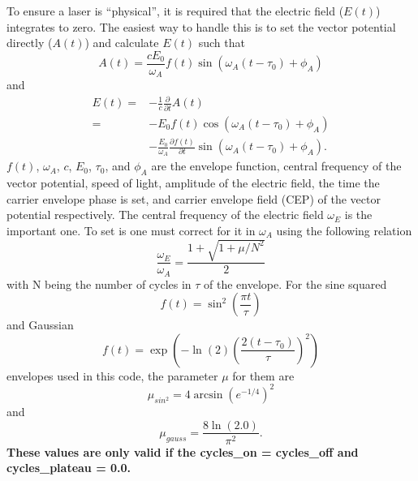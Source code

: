 \documentclass{article}
\begin{document}
To ensure a laser is ``physical'', it is required that the electric field ($E(t)$) integrates to zero. The easiest way to handle this is to set the vector potential directly ($A(t)$) and calculate $E(t)$ such that
\begin{equation}
A(t) = \frac{cE_0}{\omega_A} f(t) \sin(\omega_A(t-\tau_0)+\phi_A)
\label{eq:afield}
\end{equation}
and
\begin{equation}
\begin{split}
\label{eq:efield}
E(t) =& -\frac{1}{c}\frac{\partial}{\partial t}A(t)
\\
=&-E_0f(t) \cos(\omega_A (t-\tau_0) +\phi_A)
\\
&
-\frac{E_0}{\omega_A}\frac{\partial f(t)}{\partial t}
\sin(\omega_A (t-\tau_0) +\phi_A).
\end{split}
\end{equation}
$f(t)$, $\omega_A$,
$c$, $E_0$, $\tau_0$, and $\phi_A$ are the envelope function, central frequency of the vector potential, speed of light, amplitude of the electric field, the time the carrier envelope phase is set, and carrier envelope field (CEP) of the vector potential respectively. The central frequency of the electric field $\omega_E$ is the important one. To set is one must correct for it in $\omega_A$ using the following relation
\begin{equation}
\label{eq:fshift}
\frac{\omega_E}{\omega_A} = \frac{1+\sqrt{1+\mu/N^{2}}}{2}
\end{equation}
with N being the number of cycles in $\tau$ of the envelope. For the sine squared
\begin{equation}
f(t) = \sin^2\left(\frac{\pi t}{\tau}\right)
\label{eq:sin2}
\end{equation}
and Gaussian
\begin{equation}
f(t) = \exp\left(-\ln(2)\left(\frac{2(t-\tau_0)}{\tau}\right)^2\right)
\label{eq:gauss}
\end{equation}
envelopes used in this code, the parameter $\mu$ for them are
\begin{equation}
  \mu_{sin^2} = 4  \arcsin(e^{-1 / 4})^2
\end{equation}
and
\begin{equation}
  \mu_{gauss} = \frac{8 \ln(2.0) }{ \pi^2}.
\end{equation}
\textbf{These values are only valid if the cycles\_on = cycles\_off and cycles\_plateau = 0.0.}
\end{document}
